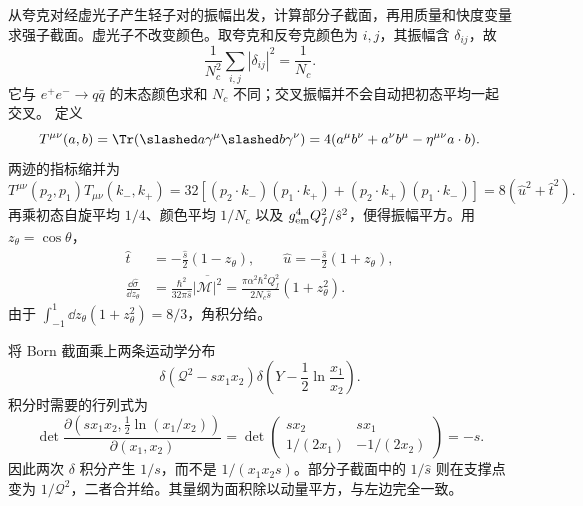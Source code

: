 \begin{derivation}
从夸克对经虚光子产生轻子对的振幅出发，计算部分子截面，再用质量和快度变量求强子截面。虚光子不改变颜色。取夸克和反夸克颜色为 $i,j$，其振幅含 $\delta_{ij}$，故
\begin{equation*}
 \frac1{N_c^2}\sum_{i,j}|\delta_{ij}|^2=\frac1{N_c}.
\end{equation*}
它与 $e^+e^-\to q\bar q$ 的末态颜色求和 $N_c$ 不同；交叉振幅并不会自动把初态平均一起交叉。
定义
\begin{equation*}
 T^{\mu\nu}(a,b)=\Tr(\slashed a\gamma^\mu\slashed b\gamma^\nu)
 =4(a^\mu b^\nu+a^\nu b^\mu-\eta^{\mu\nu}a\cdot b).
\end{equation*}
两迹的指标缩并为
\begin{equation*}
 T^{\mu\nu}(p_2,p_1)T_{\mu\nu}(k_-,k_+)
 =32[(p_2\cdot k_-)(p_1\cdot k_+)+(p_2\cdot k_+)(p_1\cdot k_-)]
 =8(\hat u^2+\hat t^2).
\end{equation*}
再乘初态自旋平均 $1/4$、颜色平均 $1/N_c$ 以及 $g_{\rm em}^4Q_f^2/\hat s^2$，便得振幅平方。用 $z_\theta=\cos\theta$，
\begin{align*}
 \hat t&=-\frac{\hat s}{2}(1-z_\theta),\qquad
 \hat u=-\frac{\hat s}{2}(1+z_\theta),\\
 \frac{\dd\hat\sigma}{\dd z_\theta}
 &=\frac{\hbar^2}{32\pi\hat s}\overline{|\mathcal M|^2}
 =\frac{\pi\alpha^2\hbar^2Q_f^2}{2N_c\hat s}(1+z_\theta^2).
\end{align*}
由于 $\int_{-1}^{1}\dd z_\theta(1+z_\theta^2)=8/3$，角积分给。

将 Born 截面乘上两条运动学分布
\begin{equation*}
 \delta(\mathcal Q^2-sx_1x_2)
 \delta\!\left(Y-\frac12\ln\frac{x_1}{x_2}\right).
\end{equation*}
积分时需要的行列式为
\begin{equation*}
 \det\frac{\partial(sx_1x_2,\frac12\ln(x_1/x_2))}{\partial(x_1,x_2)}
 =\det\begin{pmatrix}sx_2&sx_1\\1/(2x_1)&-1/(2x_2)\end{pmatrix}=-s.
\end{equation*}
因此两次 $\delta$ 积分产生 $1/s$，而不是 $1/(x_1x_2s)$。部分子截面中的 $1/\hat s$ 则在支撑点变为 $1/\mathcal Q^2$，二者合并给。其量纲为面积除以动量平方，与左边完全一致。
\end{derivation}


